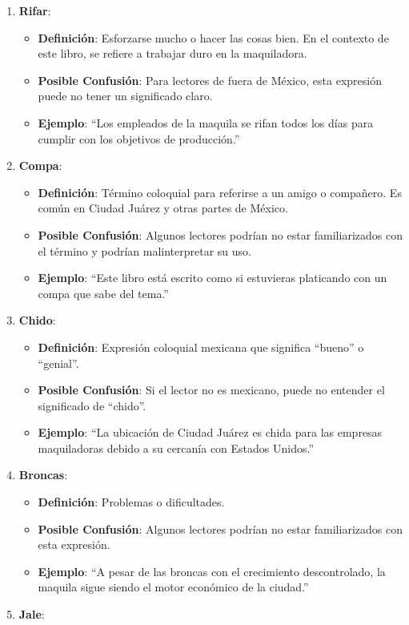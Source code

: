 \documentclass[
  10pt,
  letterpaper,
]{book}
\providecommand{\tightlist}{%
  \setlength{\itemsep}{0pt}\setlength{\parskip}{0pt}}\usepackage{longtable,booktabs,array}
\begin{document}
\begin{enumerate}
\def\labelenumi{\arabic{enumi}.}
\tightlist
\item
  \textbf{Rifar}:

  \begin{itemize}
  \tightlist
  \item
    \textbf{Definición}: Esforzarse mucho o hacer las cosas bien. En el
    contexto de este libro, se refiere a trabajar duro en la
    maquiladora.
  \item
    \textbf{Posible Confusión}: Para lectores de fuera de México, esta
    expresión puede no tener un significado claro.
  \item
    \textbf{Ejemplo}: ``Los empleados de la maquila se rifan todos los
    días para cumplir con los objetivos de producción.''
  \end{itemize}
\item
  \textbf{Compa}:

  \begin{itemize}
  \tightlist
  \item
    \textbf{Definición}: Término coloquial para referirse a un amigo o
    compañero. Es común en Ciudad Juárez y otras partes de México.
  \item
    \textbf{Posible Confusión}: Algunos lectores podrían no estar
    familiarizados con el término y podrían malinterpretar su uso.
  \item
    \textbf{Ejemplo}: ``Este libro está escrito como si estuvieras
    platicando con un compa que sabe del tema.''
  \end{itemize}
\item
  \textbf{Chido}:

  \begin{itemize}
  \tightlist
  \item
    \textbf{Definición}: Expresión coloquial mexicana que significa
    ``bueno'' o ``genial''.
  \item
    \textbf{Posible Confusión}: Si el lector no es mexicano, puede no
    entender el significado de ``chido''.
  \item
    \textbf{Ejemplo}: ``La ubicación de Ciudad Juárez es chida para las
    empresas maquiladoras debido a su cercanía con Estados Unidos.''
  \end{itemize}
\item
  \textbf{Broncas}:

  \begin{itemize}
  \tightlist
  \item
    \textbf{Definición}: Problemas o dificultades.
  \item
    \textbf{Posible Confusión}: Algunos lectores podrían no estar
    familiarizados con esta expresión.
  \item
    \textbf{Ejemplo}: ``A pesar de las broncas con el crecimiento
    descontrolado, la maquila sigue siendo el motor económico de la
    ciudad.''
  \end{itemize}
\item
  \textbf{Jale}:


\end{enumerate}
\end{document}
